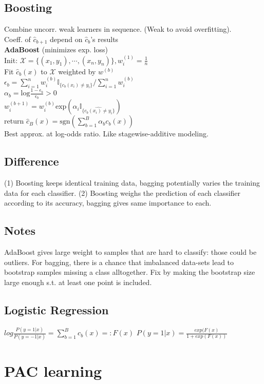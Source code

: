 \subsection*{Boosting}
Combine uncorr. weak learners in sequence. (Weak to avoid overfitting).\\
Coeff. of $\hat{c}_{b+1}$ depend on $\hat{c}_{b}$'s results\\
\textbf{AdaBoost} (minimizes exp. loss)\\
Init: $\mathcal{X}{=}\{(x_1,y_1),\cdots,(x_n,y_n)\}, w_i^{(1)}{=}\frac{1}{n}$\\
Fit  $\hat{c}_b(x)$ to $\mathcal{X}$ weighted by $w^{(b)}$\\
$\epsilon_b=\sum_{i=1}^nw_i^{(b)}\mathbb{I}_{\{c_b(x_i)\not=y_i\}}/\sum_{i=1}^nw_i^{(b)}$\\
$\alpha_b = \mathrm{log}\frac{1-\epsilon_b}{\epsilon_b}>0$\\
$w_i^{(b+1)}=w_i^{(b)}\mathrm{exp}(\alpha_i\mathbb{I}_{\{\hat{c_b(x_i)\not=y_i}\}})$\\
return $\hat{c}_B(x){=}\mathrm{sgn}(\sum_{b{=}1}^B\alpha_bc_b(x))$\\
Best approx. at log-odds ratio. Like stagewise-additive modeling.

\subsection*{Difference}
(1) Boosting keeps identical training data, bagging potentially varies the training data for each classifier. (2) Boosting weighs the prediction of each classifier according to its accuracy, bagging gives same importance to each.
\subsection*{Notes}
AdaBoost gives large weight to samples that are hard to classify: those could be outliers. For bagging, there is a chance that imbalanced data-sets lead to bootstrap samples missing a class alltogether. Fix by making the bootstrap size large enough s.t. at least one point is included.
\subsection*{Logistic Regression}
$log\frac{P(y=1|x)}{P(y=-1|x)} = \sum_{b=1}^Bc_b(x) =: F(x)$
$P(y=1|x) = \frac{exp(F(x)}{1+exp(F(x))}$

\section*{PAC learning}
